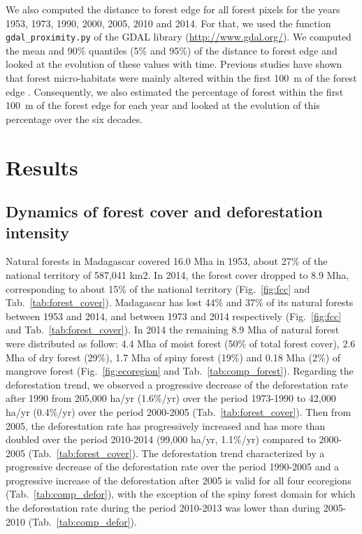 \documentclass[a4paper, 12pt, leqno]{article} %
\begin{document}
We also computed the distance to forest edge for all forest
pixels for the years 1953, 1973, 1990, 2000, 2005, 2010 and 2014. For
that, we used the function \texttt{gdal\_proximity.py} of the GDAL
library (\url{http://www.gdal.org/}). We computed the mean and 90\%
quantiles (5\% and 95\%) of the distance to forest edge and looked at
the evolution of these values with time. Previous studies have shown
that forest micro-habitats were mainly altered within the first 100~m
of the forest edge \citep{Brinck2017, Gibson2013, Murcia1995,
  Broadbent2008}. Consequently, we also estimated the percentage of
forest within the first 100~m of the forest edge for each year and
looked at the evolution of this percentage over the six decades.

\newpage

\section{Results}
\label{results}

\subsection{Dynamics of forest cover and deforestation
intensity}

Natural forests in Madagascar covered 16.0 Mha in 1953, about 27\% of
the national territory of 587,041 km2. In 2014, the forest cover
dropped to 8.9 Mha, corresponding to about 15\% of the national
territory (Fig.~\ref{fig:fcc} and
Tab.~\ref{tab:forest_cover}). Madagascar has lost 44\% and 37\% of its
natural forests between 1953 and 2014, and between 1973 and 2014
respectively (Fig.~\ref{fig:fcc} and Tab.~\ref{tab:forest_cover}). In
2014 the remaining 8.9 Mha of natural forest were distributed as follow: 4.4
Mha of moist forest (50\% of total forest cover), 2.6 Mha of dry
forest (29\%), 1.7 Mha of spiny forest (19\%) and 0.18 Mha (2\%) of
mangrove forest (Fig.~\ref{fig:ecoregion} and
Tab.~\ref{tab:comp_forest}). Regarding the deforestation trend, we
observed a progressive decrease of the deforestation rate after 1990
from 205,000 ha/yr (1.6\%/yr) over the period 1973-1990 to 42,000
ha/yr (0.4\%/yr) over the period 2000-2005
(Tab.~\ref{tab:forest_cover}). Then from 2005, the deforestation rate
has progressively increased and has more than doubled over the period
2010-2014 (99,000 ha/yr, 1.1\%/yr) compared to 2000-2005
(Tab.~\ref{tab:forest_cover}). The deforestation trend characterized
by a progressive decrease of the deforestation rate over the period
1990-2005 and a progressive increase of the deforestation after 2005
is valid for all four ecoregions (Tab.~\ref{tab:comp_defor}), with the
exception of the spiny forest domain for which the deforestation rate
during the period 2010-2013 was lower than during 2005-2010
(Tab.~\ref{tab:comp_defor}).
\end{document}
